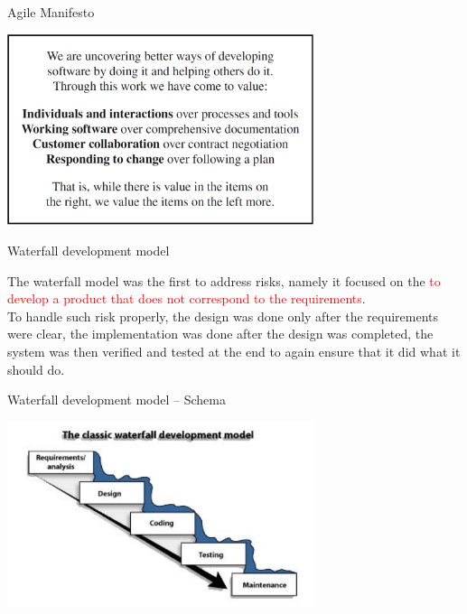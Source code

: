 \documentclass{beamer}
\begin{document}
\begin{frame}{\centerline{Agile Manifesto}}
\begin{center}
\includegraphics[width=90mm]{A2022.IDSEPC.ProcessoDiProduzione/img-img00.png}
\end{center}
\end{frame}

\begin{frame}{\centerline{Waterfall development model}}

The waterfall model was the first to address risks, namely it focused on the \textcolor{red}{to develop a product that does not correspond to the requirements}.\\

To handle such risk properly, the design was done only after the requirements were clear, the implementation was done after the design was completed, the system was then verified and tested at the end to again ensure that it did what it should do.


\end{frame}

\begin{frame}{\centerline{Waterfall development model -- Schema}}

\begin{center}
\includegraphics[width=90mm]{A2022.IDSEPC.ProcessoDiProduzione/img-02.png}
\end{center}
\small
{}
\end{frame}
\end{document}
